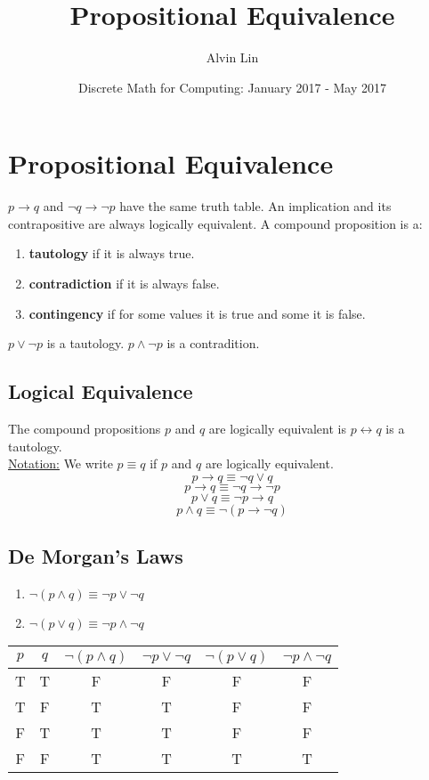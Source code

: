 \documentclass[letterpaper, 12pt]{math}
\title{Propositional Equivalence}
\author{Alvin Lin}
\date{Discrete Math for Computing: January 2017 - May 2017}
\begin{document}
\maketitle

\section*{Propositional Equivalence}
\( p \to q \)  and \( \neg{q} \to \neg{p} \) have the same truth table. An
implication and its contrapositive are always logically equivalent.
A compound proposition is a:
\begin{enumerate}
  \item \textbf{tautology} if it is always true.
  \item \textbf{contradiction} if it is always false.
  \item \textbf{contingency} if for some values it is true and some it is false.
\end{enumerate}
\( p \vee \neg{p} \) is a tautology. \( p \wedge \neg{p} \) is a contradition.

\subsection*{Logical Equivalence}
The compound propositions \( p \) and \( q \) are logically equivalent is
\( p \leftrightarrow q \) is a tautology. \\
\underline{Notation:} We write \( p \equiv q \) if \( p \) and \( q \) are
logically equivalent.
\[ p \to q \equiv \neg{q} \vee q \]
\[ p \to q \equiv \neg{q} \to \neg{p} \]
\[ p \vee q \equiv \neg{p} \to q \]
\[ p \wedge q \equiv \neg{(p \to \neg{q})} \]

\subsection*{De Morgan's Laws}
\begin{enumerate}
  \item \( \neg{(p \wedge q)} \equiv \neg{p} \vee \neg{q} \)
  \item \( \neg{(p \vee q)} \equiv \neg{p} \wedge \neg{q} \)
\end{enumerate}
\begin{center}
  \begin{tabular}{|c|c|c|c|c|c|}
    \hline
    \( p \) & \( q \) & \( \neg{(p \wedge q)} \) & \( \neg{p} \vee \neg{q} \) &
    \( \neg{(p \vee q)} \) & \( \neg{p} \wedge \neg{q} \) \\ \hline
    T & T & F & F & F & F \\ \hline
    T & F & T & T & F & F \\ \hline
    F & T & T & T & F & F \\ \hline
    F & F & T & T & T & T \\ \hline
  \end{tabular}
\end{center}
\end{document}
